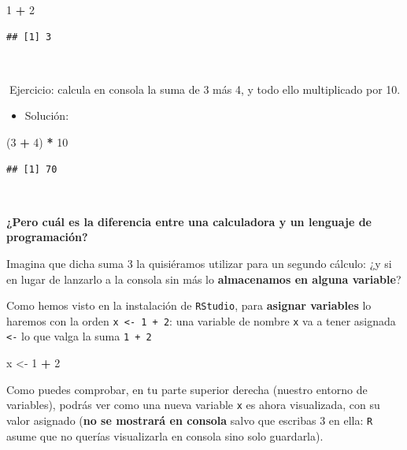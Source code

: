 \documentclass[11pt,]{book}
\newenvironment{Shaded}{\begin{snugshade}}{\end{snugshade}}
\newcommand{\DecValTok}[1]{\textcolor[rgb]{0.06,0.06,0.06}{#1}}
\newcommand{\NormalTok}[1]{#1}
\newcommand{\OperatorTok}[1]{\textcolor[rgb]{0.43,0.43,0.43}{\textbf{#1}}}
\newcommand{\StringTok}[1]{\textcolor[rgb]{0.5,0.5,0.5}{#1}}
\providecommand{\tightlist}{%
  \setlength{\itemsep}{0pt}\setlength{\parskip}{0pt}}
\begin{document}
\begin{Shaded}
\begin{Highlighting}[]
\DecValTok{1} \OperatorTok{+}\StringTok{ }\DecValTok{2}
\end{Highlighting}
\end{Shaded}

\begin{verbatim}
## [1] 3
\end{verbatim}

~

📝Ejercicio: calcula en consola la suma de 3 más 4, y todo ello multiplicado por 10.

\begin{itemize}
\tightlist
\item
  Solución:
\end{itemize}

\begin{Shaded}
\begin{Highlighting}[]
\NormalTok{(}\DecValTok{3} \OperatorTok{+}\StringTok{ }\DecValTok{4}\NormalTok{) }\OperatorTok{*}\StringTok{ }\DecValTok{10}
\end{Highlighting}
\end{Shaded}

\begin{verbatim}
## [1] 70
\end{verbatim}

~

\textbf{¿Pero cuál es la diferencia entre una calculadora y un lenguaje de programación?}

Imagina que dicha suma 3 la quisiéramos utilizar para un segundo cálculo: ¿y si en lugar de lanzarlo a la consola sin más lo \textbf{almacenamos en alguna variable}?

Como hemos visto en la instalación de \texttt{RStudio}, para \textbf{asignar variables} lo haremos con la orden \texttt{x\ \textless{}-\ 1\ +\ 2}: una variable de nombre \texttt{x} va a tener asignada \texttt{\textless{}-} lo que valga la suma \texttt{1\ +\ 2}

\begin{Shaded}
\begin{Highlighting}[]
\NormalTok{x <-}\StringTok{ }\DecValTok{1} \OperatorTok{+}\StringTok{ }\DecValTok{2}
\end{Highlighting}
\end{Shaded}

Como puedes comprobar, en tu parte superior derecha (nuestro entorno de variables), podrás ver como una nueva variable \texttt{x} es ahora visualizada, con su valor asignado (\textbf{no se mostrará en consola} salvo que escribas 3 en ella: \texttt{R} asume que no querías visualizarla en consola sino solo guardarla).
\end{document}
